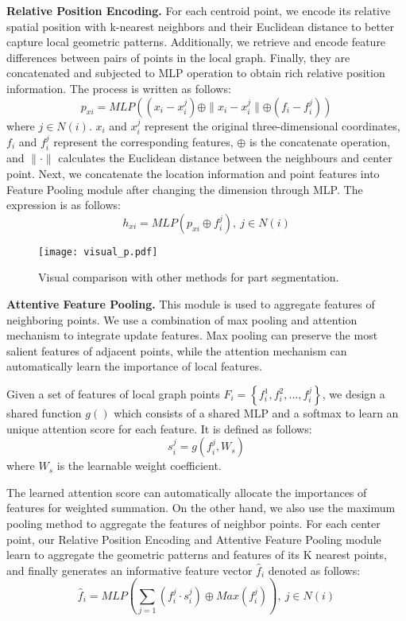 \documentclass[conference]{IEEEtran}
\begin{document}
{\bf Relative Position Encoding.} For each centroid point, we encode its relative spatial position with k-nearest neighbors and their Euclidean distance to better capture local geometric patterns. Additionally, we retrieve and encode feature differences between pairs of points in the local graph. Finally, they are concatenated and subjected to MLP operation to obtain rich relative position information. The process is written as follows:
\begin{equation}
p_{xi} = MLP ((x_i-x_i^j)\oplus\parallel x_i-x_i^j\parallel\oplus (f_i-f_i^j))
\end{equation}
where $j\in N(i)$. $x_i$ and $x_i^j$ represent the original three-dimensional coordinates, $f_i$ and $f_i^j$ represent the corresponding features, $\oplus$ is the concatenate operation, and $\parallel \cdot \parallel$ calculates the Euclidean distance between the neighbours and center point.
Next, we concatenate the location information and point features into  Feature Pooling module after changing the dimension through MLP. The expression is as follows:
\begin{equation}
h_{xi} = MLP (p_{xi}\oplus f_i^j),~j\in N(i)
\end{equation}

\begin{figure*}[t]
    \centering
   \texttt{[image: visual\_p.pdf]}
   \vspace{-8pt}
   \caption{Visual comparison with other methods for part segmentation.}
\label{visual_p}
\vspace{-4mm}
\end{figure*}


{\bf Attentive Feature Pooling.} This module is used to aggregate features of neighboring points. We use a combination of max pooling and attention mechanism to integrate update features. Max pooling can preserve the most salient features of adjacent points, while the attention mechanism can automatically learn the importance of local features. 

Given a set of features of local graph points $F_i=\left\{f_i^1,f_i^2,...,f_i^j\right\}$, we design a shared function $g( )$ which consists of a shared MLP and a softmax to learn an unique attention score for each feature. It is defined as follows:
\begin{equation}
s_i^j = g (f_i^j,W_s)
\end{equation}
where $W_s$ is the learnable weight coefficient.

The learned attention score can automatically allocate the importances of  features for weighted summation. On the other hand, we also use the maximum pooling method to aggregate the features of neighbor points. For each center point, our Relative Position Encoding and Attentive Feature Pooling module learn to aggregate the geometric patterns and features of its K nearest points, and finally generates an informative feature vector $\hat{f}_i$ denoted as follows:
\begin{equation}
\hat{f}_i = MLP(\sum_{j=1}(f_i^j \cdot s_i^j) \oplus Max(f_i^j)), ~j\in N(i)
\end{equation}
\end{document}

